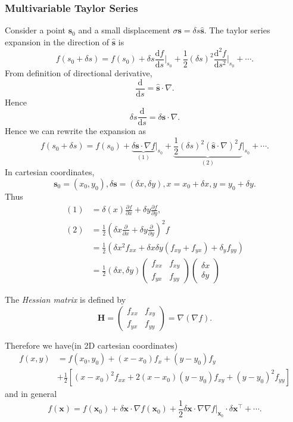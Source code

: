 \documentclass[a4paper]{article}
\begin{document}
    \subsubsection{Multivariable Taylor Series}
    Consider a point $\mathbf{s}_0$ and a small displacement $ \sigma\mathbf{s} = \delta s \hat{\mathbf{s}} $. The taylor series expansion in the direction of $\hat{\mathbf{s}}$ is 
    \[
        f(s_0+\delta s)=f(s_0)+\delta s \frac{\mathrm{d}f}{\mathrm{d}s}\Big|_{s_0}+\frac{1}{2}(\delta s)^2 \frac{\mathrm{d}^2f}{\mathrm{d}s^2}\Big|_{s_0}+\cdots  . 
    \]
    From definition of directional derivative, 
    \[
        \frac{\mathrm{d}}{\mathrm{d}s} = \hat{\mathbf{s}}\cdot \nabla. 
    \]
    Hence 
    \[
        \delta s \frac{\mathrm{d}}{\mathrm{d}s}=\delta\mathbf{s} \cdot \nabla . 
    \]
    Hence we can rewrite the expansion as 
    \[
        f(s_0+\delta s)=f(s_0)+\underbrace{\delta\mathbf{s} \cdot \nabla f}_{(1)}\Big|_{s_0}+\underbrace{\frac{1}{2}(\delta s)^2(\hat{\mathbf{s}}\cdot \nabla )^2 f}_{(2)}\Big|_{s_0}+\cdots .
    \]
    In cartesian coordinates,
    \[
        \mathbf{s}_0=(x_0,y_0), \delta\mathbf{s} = (\delta x,\delta y), x=x_0+\delta x, y=y_0+\delta y.
    \]
    Thus 
    \begin{align*}
        (1)&=\delta(x)\frac{\partial f}{\partial x}+\delta y \frac{\partial f}{\partial y}, \\
        (2)&= \frac{1}{2}\left( \delta x \frac{\partial }{\partial x}+\delta y \frac{\partial }{\partial y}   \right)^2 f\\
        &= \frac{1}{2}\left( \delta x^2 f_{xx}+\delta x\delta y (f_{xy}+f_{yx})+\delta_y f_{yy} \right)\\
        &= \frac{1}{2}(\delta x, \delta y) \begin{pmatrix}
            f_{xx}& f_{xy}\\
            f_{yx}& f_{yy}
        \end{pmatrix}
        \begin{pmatrix}
            \delta x\\ \delta y
        \end{pmatrix}
    \end{align*}
    \begin{definition}
        The \textit{Hessian matrix} is defined by 
        \[
            \mathbf{H} = \begin{pmatrix}
                f_{xx}& f_{xy}\\
            f_{yx}& f_{yy}
            \end{pmatrix} = \nabla (\nabla f).
        \]
    \end{definition}
    Therefore we have(in 2D cartesian coordinates)
    \begin{align*}
        f(x, y) &= f(x_0, y_0) + (x - x_0)f_x + (y - y_0)f_y \\
        &+ \frac{1}{2}[(x - x_0)^2 f_{xx} + 2(x - x_0)(y - y_0)f_{xy} + (y - y_0)^2 f_{yy}]
      \end{align*}
      and in general 
      \[
        f(\mathbf{x}) = f(\mathbf{x}_0 ) + \delta \mathbf{x}\cdot\nabla f(\mathbf{x}_0) + \frac{1}{2}\delta \mathbf{x}\cdot \nabla \nabla f\Big|_{\mathbf{x}_0}\cdot \delta \mathbf{x}^{\top}+ \cdots .
      \]
\end{document}

